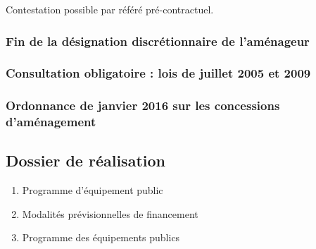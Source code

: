 		Contestation possible par référé pré-contractuel. \lips

		\subsubsection{Fin de la désignation discrétionnaire de l'aménageur}

		\subsubsection{Consultation obligatoire : lois de juillet 2005 et 2009}

		\subsubsection{Ordonnance de janvier 2016 sur les concessions d'aménagement}

	\subsection{Dossier de réalisation}

		\begin{enumerate}
			\item Programme d'équipement public
			\item Modalités prévisionnelles de financement
			\item Programme des équipements publics
		\end{enumerate}

